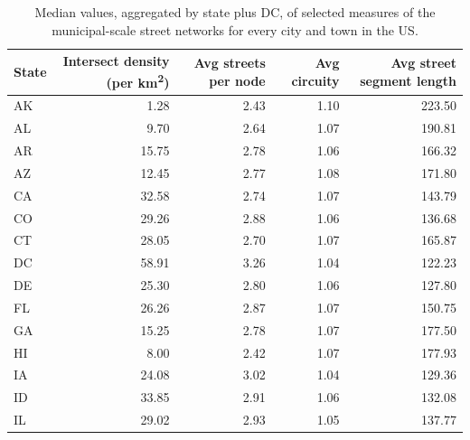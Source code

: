 \documentclass[Afour,sageh,times]{sagej}
\begin{document}
\begin{table}
\centering
\caption{Median values, aggregated by state plus DC, of selected measures of the municipal-scale street networks for every city and town in the US.}
\label{tab:medians_state_aggregate}
\begin{tabular}{ l r r r r }
	\toprule
	State & Intersect density (per km\textsuperscript{2}) & Avg streets per node & Avg circuity & Avg street segment length \\
	\midrule
	AK    &  1.28                       & 2.43                 & 1.10         & 223.50                    \\
	AL    &  9.70                       & 2.64                 & 1.07         & 190.81                    \\
	AR    & 15.75                       & 2.78                 & 1.06         & 166.32                    \\
	AZ    & 12.45                       & 2.77                 & 1.08         & 171.80                    \\
	CA    & 32.58                       & 2.74                 & 1.07         & 143.79                    \\
	CO    & 29.26                       & 2.88                 & 1.06         & 136.68                    \\
	CT    & 28.05                       & 2.70                 & 1.07         & 165.87                    \\
	DC    & 58.91                       & 3.26                 & 1.04         & 122.23                    \\
	DE    & 25.30                       & 2.80                 & 1.06         & 127.80                    \\
	FL    & 26.26                       & 2.87                 & 1.07         & 150.75                    \\
	GA    & 15.25                       & 2.78                 & 1.07         & 177.50                    \\
	HI    &  8.00                       & 2.42                 & 1.07         & 177.93                    \\
	IA    & 24.08                       & 3.02                 & 1.04         & 129.36                    \\
	ID    & 33.85                       & 2.91                 & 1.06         & 132.08                    \\
	IL    & 29.02                       & 2.93                 & 1.05         & 137.77                    \\

\end{tabular}
\end{table}
\end{document}
